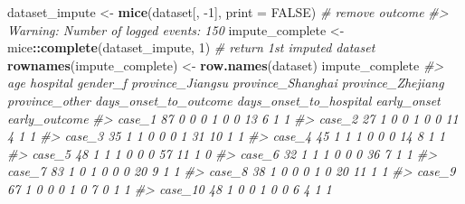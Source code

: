 \documentclass[]{book}
\newenvironment{Shaded}{\begin{snugshade}}{\end{snugshade}}
\newcommand{\CommentTok}[1]{\textcolor[rgb]{0.56,0.35,0.01}{\textit{#1}}}
\newcommand{\DataTypeTok}[1]{\textcolor[rgb]{0.13,0.29,0.53}{#1}}
\newcommand{\DecValTok}[1]{\textcolor[rgb]{0.00,0.00,0.81}{#1}}
\newcommand{\KeywordTok}[1]{\textcolor[rgb]{0.13,0.29,0.53}{\textbf{#1}}}
\newcommand{\NormalTok}[1]{#1}
\newcommand{\OperatorTok}[1]{\textcolor[rgb]{0.81,0.36,0.00}{\textbf{#1}}}
\newcommand{\OtherTok}[1]{\textcolor[rgb]{0.56,0.35,0.01}{#1}}
\newcommand{\StringTok}[1]{\textcolor[rgb]{0.31,0.60,0.02}{#1}}
\begin{document}
\begin{Shaded}
\begin{Highlighting}[]
\NormalTok{dataset_impute  <-}\StringTok{ }\KeywordTok{mice}\NormalTok{(dataset[, }\DecValTok{-1}\NormalTok{],  }\DataTypeTok{print =} \OtherTok{FALSE}\NormalTok{)  }\CommentTok{# remove outcome}
\CommentTok{#> Warning: Number of logged events: 150}
\NormalTok{impute_complete <-}\StringTok{ }\NormalTok{mice}\OperatorTok{::}\KeywordTok{complete}\NormalTok{(dataset_impute, }\DecValTok{1}\NormalTok{) }\CommentTok{# return 1st imputed dataset}
\KeywordTok{rownames}\NormalTok{(impute_complete) <-}\StringTok{ }\KeywordTok{row.names}\NormalTok{(dataset)}
\NormalTok{impute_complete}
\CommentTok{#>          age hospital gender_f province_Jiangsu province_Shanghai province_Zhejiang province_other days_onset_to_outcome days_onset_to_hospital early_onset early_outcome}
\CommentTok{#> case_1    87        0        0                0                 1                 0              0                    13                      6           1             1}
\CommentTok{#> case_2    27        1        0                0                 1                 0              0                    11                      4           1             1}
\CommentTok{#> case_3    35        1        1                0                 0                 0              1                    31                     10           1             1}
\CommentTok{#> case_4    45        1        1                1                 0                 0              0                    14                      8           1             1}
\CommentTok{#> case_5    48        1        1                1                 0                 0              0                    57                     11           1             0}
\CommentTok{#> case_6    32        1        1                1                 0                 0              0                    36                      7           1             1}
\CommentTok{#> case_7    83        1        0                1                 0                 0              0                    20                      9           1             1}
\CommentTok{#> case_8    38        1        0                0                 0                 1              0                    20                     11           1             1}
\CommentTok{#> case_9    67        1        0                0                 0                 1              0                     7                      0           1             1}
\CommentTok{#> case_10   48        1        0                0                 1                 0              0                     6                      4           1             1}

\end{Highlighting}
\end{Shaded}
\end{document}
